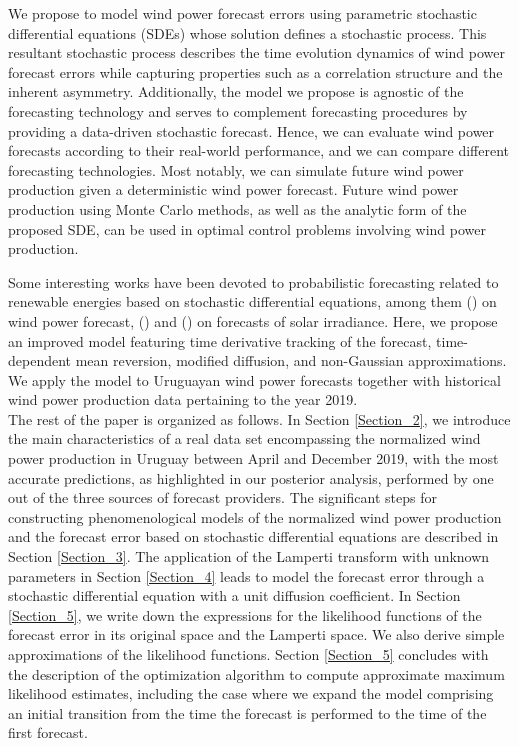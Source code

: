 \documentclass[11pt]{article}
\theoremstyle{definition}
\begin{document}
We propose to model wind power forecast errors using parametric stochastic differential equations (SDEs) whose solution defines a stochastic process. This resultant stochastic process describes the time evolution dynamics of wind power forecast errors while capturing properties such as a correlation structure and the inherent asymmetry. Additionally, the model we propose is agnostic of the forecasting technology and serves to complement forecasting procedures by providing a data-driven stochastic forecast. Hence, we can evaluate wind power forecasts according to their real-world performance, and we can compare different forecasting technologies. Most notably, we can simulate future wind power production given a deterministic wind power forecast. Future wind power production using Monte Carlo methods, as well as the analytic form of the proposed SDE, can be used in optimal control problems involving wind power production.

 {\color{black} Some interesting works have been devoted to probabilistic forecasting related to renewable energies based on stochastic differential equations, among them (\cite{mozuma}) on wind power forecast, (\cite{immm}) and (\cite{bggk}) on forecasts of solar irradiance.}
Here, we propose an improved model featuring time derivative tracking of the forecast, time-dependent mean reversion, modified diffusion, and non-Gaussian approximations. We apply the model to Uruguayan wind power forecasts together with historical wind power production data pertaining to the year 2019. \\

The rest of the paper is organized as follows. In Section \ref{Section_2}, we introduce the main characteristics of a real data set encompassing the normalized wind power production in Uruguay between April and December 2019, with the most accurate predictions, as highlighted in our posterior analysis, performed by one out of the three sources of forecast providers. The significant steps for constructing phenomenological models of the normalized wind power production and the forecast error based on stochastic differential equations are described in Section \ref{Section_3}. The application of the Lamperti transform with unknown parameters in Section \ref{Section_4} leads to model the forecast error through a stochastic differential equation with a unit diffusion coefficient. In Section \ref{Section_5}, we write down the expressions for the likelihood functions of the forecast error in its original space and the Lamperti space. We also derive simple approximations of the likelihood functions. Section \ref{Section_5} concludes with the description of the optimization algorithm to compute approximate maximum likelihood estimates, including the case where we expand the model comprising an initial transition from the time the forecast is performed to the time of the first forecast.
\end{document}

